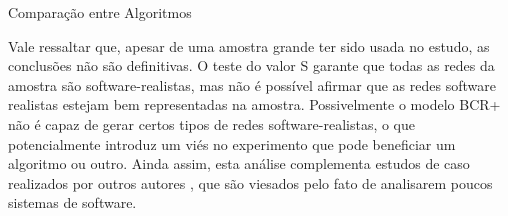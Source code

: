 \begin{section}{Comparação entre Algoritmos}

Vale ressaltar que, apesar de uma amostra grande ter sido usada no estudo, as conclusões não são definitivas. O teste do valor S garante que todas as redes da amostra são software-realistas, mas não é possível afirmar que as redes software realistas estejam bem representadas na amostra. Possivelmente o modelo BCR+ não é capaz de gerar certos tipos de redes software-realistas, o que potencialmente introduz um viés no experimento que pode beneficiar um algoritmo ou outro. Ainda assim, esta análise complementa estudos de caso realizados por outros autores \cite{Wu2005,Andritsos2005}, que são viesados pelo fato de analisarem poucos sistemas de software.


\end{section}


